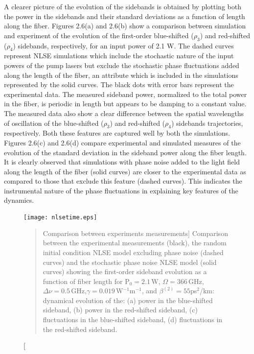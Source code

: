 A clearer picture of the evolution of the sidebands is obtained by plotting both the
power in the sidebands and their standard deviations as a function of length along the fiber. Figures 2.6(a) and 2.6(b) show a comparison between simulation and experiment of the evolution
of the first-order blue-shifted ($\rho_3$) and red-shifted ($\rho_4$) sidebands,
respectively, for an input power of 2.1 W. The dashed curves represent NLSE simulations
which include the stochastic nature of the input powers of the pump lasers but exclude
the stochastic phase fluctuations added along the length of the fiber, an attribute
which is included in the simulations represented by the solid curves. The black dots
with error bars represent the experimental data. The measured sideband
power, normalized to the total power in the fiber, is periodic in length but
appears to be damping to a constant value. The measured data also show a clear
difference between the spatial wavelengths of oscillation of the blue-shifted ($\rho_3$) and red-shifted ($\rho_4$) sidebands trajectories, respectively. Both these features are captured well by both the simulations. Figures 2.6(c) and 2.6(d) compare experimental and simulated
measures of the evolution of the standard deviation in the sideband power
along the fiber length. It is clearly observed that simulations with phase noise
added to the light field along the length of the fiber (solid curves) are closer to the
experimental data as compared to those that exclude this feature (dashed curves). This indicates
the instrumental nature of the phase fluctuations in explaining key features of the dynamics.

\begin{figure}
\begin{center}
\texttt{[image: nlsetime.eps]}
\end{center}
\renewcommand{\baselinestretch}{1}
\small\normalsize
\begin{quote}
\caption
[Comparison between experiments measurements]
{Comparison between the experimental measurements \cite{hart1}(black), the random initial condition NLSE model excluding phase noise (dashed curves) and the stochastic phase noise NLSE model (solid curves) showing the first-order sideband evolution as a function of fiber length for P$_{0} = 2.1$\,W, $\Omega = 366$\,GHz, $\Delta\nu = 0.5$\,GHz,$\gamma = 0.019$\,W$^{-1}$m$^{-1}$, and $\beta^{(2)} = 55$ps$^2$/km: dynamical evolution of the: (a) power in the blue-shifted sideband, (b) power in the red-shifted sideband, (c) fluctuations in the blue-shifted sideband, (d) fluctuations in the red-shifted sideband.}
\label{fig2.6}
\end{quote}
\end{figure}
\renewcommand{\baselinestretch}{2}
\small\normalsize

